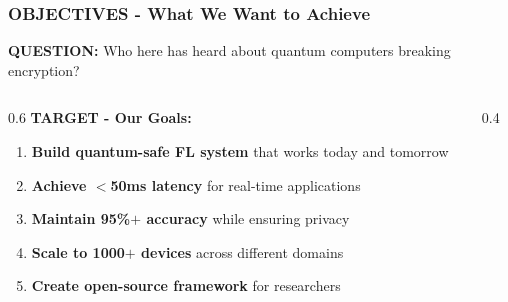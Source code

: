 \documentclass[aspectratio=169]{beamer}
\begin{document}
\begin{frame}
    \frametitle{OBJECTIVES - What We Want to Achieve}
    
    \textbf{QUESTION:} Who here has heard about quantum computers breaking encryption?
    
    \vspace{0.5cm}
    
    \begin{columns}
        \begin{column}{0.6\textwidth}
            \textbf{TARGET - Our Goals:}
            \begin{enumerate}
                \item \textbf{Build quantum-safe FL system} that works today and tomorrow
                \item \textbf{Achieve $<$50ms latency} for real-time applications  
                \item \textbf{Maintain 95\%$+$ accuracy} while ensuring privacy
                \item \textbf{Scale to 1000$+$ devices} across different domains
                \item \textbf{Create open-source framework} for researchers
            \end{enumerate}
        \end{column}
        \begin{column}{0.4\textwidth}
        \end{column}
    \end{columns}
\end{frame}
\end{document}
